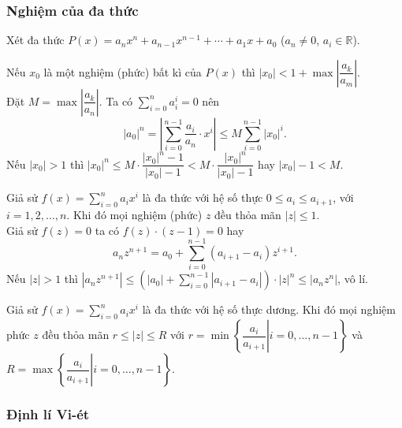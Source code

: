 \subsubsection{Nghiệm của đa thức}
Xét đa thức $P(x)=a_nx^n+a_{n-1}x^{n-1}+\cdots +a_1x+a_0$ ($a_n\neq 0$, $a_i\in\mathbb{R}$).
\begin{bode}
Nếu $x_0$ là một nghiệm (phức) bất kì của $P(x)$ thì $\left|x_0\right|<1+\max\left|\dfrac{a_k}{a_m}\right|$.\\
Đặt $M=\max\left|\dfrac{a_k}{a_n}\right|$. Ta có $\displaystyle\sum_{i=0}^na_i^{i}=0$ nên
$$\left| a_0\right|^n=\left|\displaystyle\sum_{i=0}^{n-1}\dfrac{a_i}{a_n}\cdot x^i\right|\le M\displaystyle\sum_{i=0}^{n-1}\left| x_0\right|^i.$$
Nếu $\left|x_0\right|>1$ thì $\left| x_0\right|^n\le M\cdot\dfrac{\left|x_0\right|^n-1}{\left|x_0\right|-1}<M\cdot\dfrac{\left| x_0\right|^n}{\left| x_0\right|-1}$ hay $\left| x_0\right|-1<M$.
\end{bode}
\begin{bode}
Giả sử $f(x)=\displaystyle\sum_{i=0}^na_ix^i$ là đa thức với hệ số thực $0\le a_i\le a_{i+1}$, với $i=1,2,\ldots,n$. Khi đó mọi nghiệm (phức) $z$ đều thỏa mãn $|z|\le 1$.\\
Giả sử $f(z)=0$ ta có $f(z)\cdot (z-1)=0$ hay 
$$a_n z^{n+1}=a_0+\displaystyle\sum_{i=0}^{n-1}\left(a_{i+1}-a_i\right) z^{i+1}.$$
Nếu $|z|>1$ thì
$\left| a_nz^{n+1}\right|\le \left(\left|a_0\right|+\displaystyle\sum_{i=0}^{n-1}\left|a_{i+1}-a_i\right|\right)\cdot |z|^n\le \left|a_nz^n\right|$, vô lí.
\end{bode}

\begin{hq}
Giả sử $f(x)=\displaystyle\sum_{i=0}^na_ix^i$ là đa thức với hệ số thực dương. Khi đó mọi nghiệm phức $z$ đều thỏa mãn $r\le |z|\le R$ với $r=\min\left\{\left.\dfrac{a_i}{a_{i+1}}\right| i=0,\ldots, n-1\right\}$ và $R=\max\left\{\left.\dfrac{a_i}{a_{i+1}}\right| i=0,\ldots, n-1\right\}$.
\end{hq}

\subsubsection{Định lí Vi-ét}


